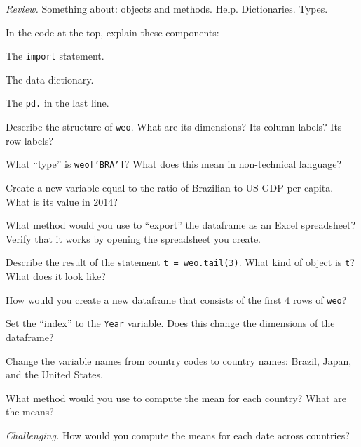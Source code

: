 \documentclass[11pt]{exam}
\begin{document}
\begin{questions}
\item {\it Review.\/}  Something about:  objects and methods.  Help.  Dictionaries.  Types.  

\item In the code at the top, explain these components:
\begin{parts}
\item The \texttt{import} statement.
\item The data dictionary.   
\item The \texttt{pd.} in the last line. 
\end{parts} 

\item Describe the structure of \texttt{weo}.  What are its dimensions?  
Its column labels? Its row labels?  

\item What ``type'' is \texttt{weo['BRA']}?
What does this mean in non-technical language?   

\item Create a new variable equal to the ratio of Brazilian to US GDP per capita.  
What is its value in 2014?  

\item What method would you use to ``export'' the dataframe as an Excel spreadsheet?  
Verify that it works by opening the spreadsheet you create.  

\item Describe the result of the statement \texttt{t = weo.tail(3)}.  
What kind of object is \texttt{t}?  What does it look like?  

\item How would you create a new dataframe that consists of the first 4 rows of \texttt{weo}?  

\item Set the ``index'' to the \texttt{Year} variable.
Does this change the dimensions of the dataframe?

\item Change the variable names from country codes to country names:  
Brazil, Japan, and the United States.  

\item What method would you use to compute the mean for each country?
What are the means?  

\item {\it Challenging.\/} 
How would you compute the means for each date across countries?  


\end{questions}
\end{document}
